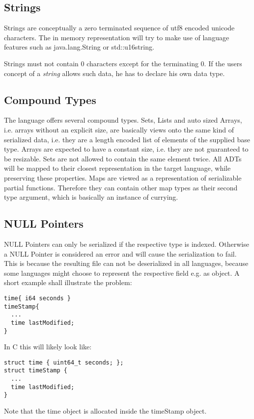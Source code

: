 \documentclass[a4paper,10pt]{article}
\begin{document}
\subsection*{Strings}

Strings are conceptually a zero terminated sequence of utf8 encoded unicode characters. The in memory representation will try to make use of language features such as java.lang.String or std::u16string.

Strings must not contain 0 characters except for the terminating 0. If the users concept of a \textit{string} allows such data, he has to declare his own data type.

\subsection*{Compound Types}

The language offers several compound types. Sets, Lists and auto sized Arrays, i.e. arrays without an explicit size, are basically views onto the same kind of serialized data, i.e. they are a length encoded list of elements of the supplied base type. Arrays are expected to have a constant size, i.e. they are not guaranteed to be resizable. Sets are not allowed to contain the same element twice.
All ADTs will be mapped to their closest representation in the target language, while preserving these properties.
Maps are viewed as a representation of serializable partial functions. Therefore they can contain other map types as their second type argument, which is basically an instance of currying.

\subsection*{NULL Pointers}

NULL Pointers can only be serialized if the respective type is indexed. Otherwise a NULL Pointer is considered an error and will cause the serialization to fail. This is because the resulting file can not be deserialized in all languages, because some languages might choose to represent the respective field e.g. as object. A short example shall illustrate the problem:
\begin{verbatim}
time{ i64 seconds }
timeStamp{
  ...
  time lastModified;
}
\end{verbatim}

In C this will likely look like:
\begin{verbatim}
struct time { uint64_t seconds; };
struct timeStamp {
  ...
  time lastModified;
}
\end{verbatim}
Note that the time object is allocated inside the timeStamp object.
\end{document}
